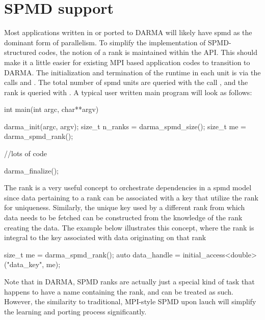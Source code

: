 \section{SPMD support}
\label{sec:spmd}
Most applications written in or ported to DARMA will likely have \gls{spmd} as
the dominant form of parallelism.
To simplify the implementation of SPMD-structured codes, the notion of a \gls{rank} is maintained within the \gls{API}.   
This should make it a little easier for existing MPI based application codes to transition 
to DARMA. The initialization and termination of the runtime in each unit is via the calls 
and . The total number of \gls{spmd} units are queried with the call ,
and the rank is queried with . A typical user written main program will look as follows:
\begin{CppCode}
int main(int argc, char**argv){

	darma_init(argc, argv);
	size_t n_ranks = darma_spmd_size();
	size_t me = darma_spmd_rank();

	//lots of code

	darma_finalize();
}
\end{CppCode}

The rank is a very useful concept to orchestrate dependencies in a \gls{spmd}
model since data pertaining to a rank can be associated with a key that utilize
the rank for uniqueness. Similarly, the unique key used by a different rank
from which data needs to be fetched can be constructed from the knowledge of
the rank creating the data.  The example below illustrates this concept, where
the rank is integral to the key associated with data originating on that rank
\begin{CppCode}
size_t me = darma_spmd_rank();
auto data_handle = initial_access<double>("data_key", me);
\end{CppCode}  
Note that in DARMA, SPMD ranks are actually just a special kind of task that
happens to have a name containing the rank, and can be treated as such. 
However, the similarity to traditional, MPI-style SPMD upon lauch will simplify
the learning and porting process significantly.


